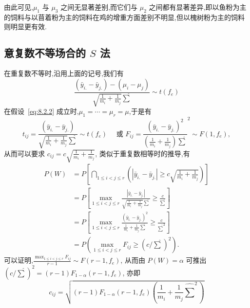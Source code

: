 由此可见,$\mu_1$ 与 $\mu_3$ 之间无显著差别,而它们与 $\mu_2$ 之间都有显著差异,即以鱼粉为主的饲料与以苜着粉为主的饲料在鸡的增重方面差别不明显,但以槐树粉为主的饲料则明显更有效.

\subsection[意复数不等场合的 S 法]{意复数不等场合的 $S$ 法}

在重复数不等时,沿用上面的记号,我们有
\begin{equation*}
  \frac{(\bar{y}_{i.} - \bar{y}_{j.}) - (\mu_i - \mu_j)}{\sqrt{\frac{1}{m_i}+\frac{1}{m_j}}\hat{\sum}} \sim t(f_e)
\end{equation*}
在假设~\eqref{eq:8.2.2} 成立时,$\mu_1 = \cdots = \mu_r = \mu$,于是有
\begin{equation*}
  t_{ij} =   \frac{(\bar{y}_{i.} - \bar{y}_{j.})}{\sqrt{\frac{1}{m_i}+\frac{1}{m_j}}\hat{\sum}} \sim t(f_e) \quad \text{ 或 } F_{ij} = \frac{(\bar{y}_{i.} - \bar{y}_{j.})^2}{\left(\frac{1}{m_i}+\frac{1}{m_j}\right)\hat{\sum}}^2 \sim F(1, f_e),
\end{equation*}
从而可以要求 $c_{ij} = c \sqrt{\frac{1}{m_i}+\frac{1}{m_j}}$, 类似于重复数相等时的推导,有
\begin{align*}
  P(W) & = P \left[\bigcap_{1\leq i < j \leq r} \left(|\bar{y}_{i.} - \bar{y}_{j.}| \geq c \sqrt{\frac{1}{m_i}+\frac{1}{m_j}}\right)\right] \\
       & = P \left[\max_{1 \leq i < j \leq r} \frac{|\bar{y}_{i.} - \bar{y}_{j.}|}{\sqrt{\frac{1}{m_i}+\frac{1}{m_j}}\hat{\sum}} \geq \frac{c}{\hat{\sum}}\right] \\
       & = P \left[\max_{1 \leq i < j \leq r} \frac{(\bar{y}_{i.} - \bar{y}_{j.})^2}{\frac{1}{m_i}+\frac{1}{m_j}\hat{\sum}} \geq \frac{c}{\hat{\sum}^2}\right] \\
       & = P(\max_{1\leq i < j \leq r} F_{ij} \geq (c/\hat{\sum})^2).
\end{align*}
可以证明,$\frac{\max_{1\leq i < j \leq r} F_{ij}}{r-1} \sim F(r-1, f_e)$, 从而由 $P(W)=\alpha$ 可推出 $(c/\hat{\sum})^2 = (r-1) F_{1-\alpha} (r-1, f_e)$, 亦即
\begin{equation*}
  c_{ij} = \sqrt{(r-1) F_{1-\alpha}(r-1, f_e) \left(\frac{1}{m_i} + \frac{1}{m_j} \hat{\sum}^2\right)}
\end{equation*}

